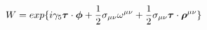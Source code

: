 \begin{equation}
W= exp\{i\gamma_5 \mbox{\boldmath$\tau$}\cdot \mbox{\boldmath$ \phi$} + \frac{1}{2} \sigma_{\mu\nu} \omega^{\mu\nu} + \frac{1}{2} \sigma_{\mu\nu} \mbox{\boldmath$\tau$}\cdot \mbox{\boldmath$\rho$}^{\mu\nu}\}   \label{eq:v1}
\end{equation}

